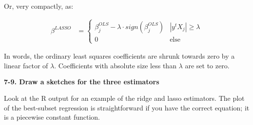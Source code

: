 \documentclass[12pt,hidelinks]{article}
\numberwithin{equation}{section}
\begin{document}
Or, very compactly, as:

\begin{align*}
\beta^{LASSO} &= \begin{cases} \beta^{OLS}_j - \lambda \cdot sign(\beta^{OLS}_j) & |y^t X_j| \geq \lambda \\
                                0 & \text{else} \end{cases}
\end{align*}

In words, the ordinary least squares coefficients are shrunk towards zero by a
linear factor of $\lambda$. Coefficients with absolute size less than $\lambda$
are set to zero.

\vspace*{12pt}

\textbf{7-9. Draw a sketches for the three estimators}

\vspace*{12pt}

Look at the R output for an example of the ridge and lasso estimators. The plot of
the best-subset regression is straightforward if you have the correct equation; it
is a piecewise constant function.
\end{document}
